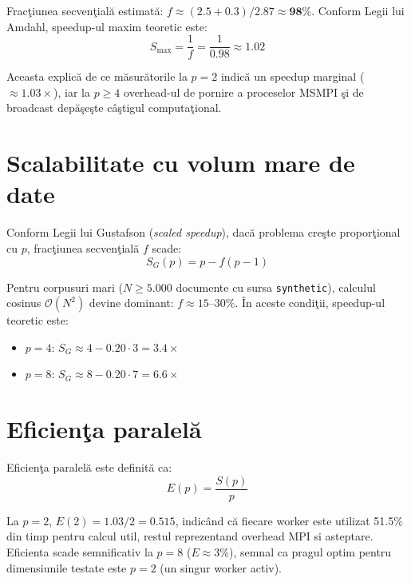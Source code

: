 \documentclass[a4paper,12pt]{report}
\begin{document}
Frac\c{t}iunea secven\c{t}ial\u{a} estimat\u{a}: $f \approx (2.5 + 0.3) / 2.87 \approx \mathbf{98\%}$. Conform Legii lui Amdahl, speedup-ul maxim teoretic este:
\begin{equation}
  S_{\max} = \frac{1}{f} = \frac{1}{0.98} \approx 1.02
\label{eq:smax}
\end{equation}

Aceasta explic\u{a} de ce m\u{a}sur\u{a}torile la $p=2$ indic\u{a} un speedup marginal ($\approx 1.03\times$), iar la $p \geq 4$ overhead-ul de pornire a proceselor MSMPI \c{s}i de broadcast dep\u{a}\c{s}e\c{s}te c\^{a}\c{s}tigul computa\c{t}ional.

\section{Scalabilitate cu volum mare de date}

Conform Legii lui Gustafson \cite{gustafson1988} (\textit{scaled speedup}), dac\u{a} problema cre\c{s}te propor\c{t}ional cu $p$, frac\c{t}iunea secven\c{t}ial\u{a} $f$ scade:
\begin{equation}
  S_G(p) = p - f(p-1)
\label{eq:gustafson}
\end{equation}

Pentru corpusuri mari ($N \geq 5.000$ documente cu sursa \texttt{synthetic}), calculul cosinus $\mathcal{O}(N^2)$ devine dominant: $f \approx 15$–$30\%$. \^{I}n aceste condi\c{t}ii, speedup-ul teoretic este:
\begin{itemize}
  \item $p=4$: $S_G \approx 4 - 0.20 \cdot 3 = 3.4\times$
  \item $p=8$: $S_G \approx 8 - 0.20 \cdot 7 = 6.6\times$
\end{itemize}

\section{Eficien\c{t}a paralel\u{a}}

Eficien\c{t}a paralel\u{a} este definit\u{a} ca:
\begin{equation}
  E(p) = \frac{S(p)}{p}
\label{eq:efficiency}
\end{equation}

La $p=2$, $E(2) = 1.03/2 = 0.515$, indic\^{a}nd c\u{a} fiecare worker este utilizat 51.5\% din timp pentru calcul util, restul reprezentand overhead MPI si asteptare. Eficienta scade semnificativ la $p=8$ ($E \approx 3\%$), semnal ca pragul optim pentru dimensiunile testate este $p=2$ (un singur worker activ).
\end{document}
